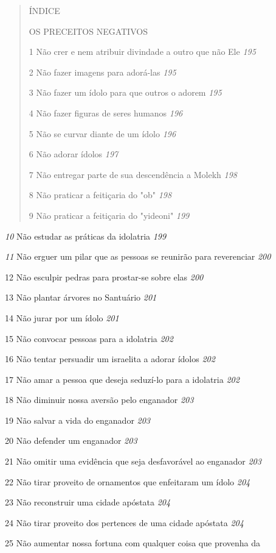 \begin{quote}
ÍNDICE

OS PRECEITOS NEGATIVOS

1 Não crer e nem atribuir divindade a outro que não Ele \emph{195}

2 Não fazer imagens para adorá-las \emph{195}

3 Não fazer um ídolo para que outros o adorem \emph{195}

4 Não fazer figuras de seres humanos \emph{196}

5 Não se curvar diante de um ídolo \emph{196}

6 Não adorar ídolos \emph{197}

7 Não entregar parte de sua descendência a Molekh \emph{198}

8 Não praticar a feitiçaria do "ob" \emph{198}

9 Não praticar a feitiçaria do "yideoni" \emph{199}
\end{quote}

\emph{10} Não estudar as práticas da idolatria \emph{199}

\emph{11} Não erguer um pilar que as pessoas se reunirão para
reverenciar \emph{200}

12 Não esculpir pedras para prostar-se sobre elas \emph{200}

13 Não plantar árvores no Santuário \emph{201}

14 Não jurar por um ídolo \emph{201}

15 Não convocar pessoas para a idolatria \emph{202}

16 Não tentar persuadir um israelita a adorar ídolos \emph{202}

17 Não amar a pessoa que deseja seduzí-lo para a idolatria \emph{202}

18 Não diminuir nossa aversão pelo enganador \emph{203}

19 Não salvar a vida do enganador \emph{203}

20 Não defender um enganador \emph{203}

21 Não omitir uma evidência que seja desfavorável ao enganador
\emph{203}

22 Não tirar proveito de ornamentos que enfeitaram um ídolo \emph{204}

23 Não reconstruir uma cidade apóstata \emph{204}

24 Não tirar proveito dos pertences de uma cidade apóstata \emph{204}

25 Não aumentar nossa fortuna com qualquer coisa que provenha da

